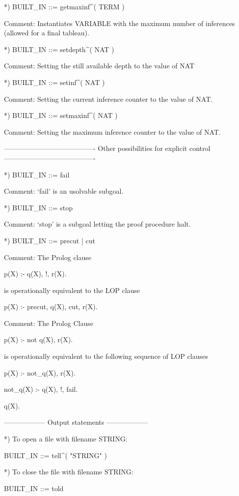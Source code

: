 *) BUILT_IN ::= getmaxinf^( TERM ) 

   Comment: Instantiates VARIABLE with the maximum number 
   	    of inferences (allowed for a final tableau).


*) BUILT_IN ::= setdepth^( NAT )
	
   Comment: Setting the still available depth to the value of NAT

*) BUILT_IN ::= setinf^( NAT )

   Comment: Setting the current inference counter to the value of NAT.

*) BUILT_IN ::= setmaxinf^( NAT )

   Comment: Setting the maximum inference counter to the value of NAT.



----------------------------------------
Other possibilities for explicit control
----------------------------------------


*) BUILT_IN ::= fail

   Comment: `fail' is an usolvable subgoal. 

*) BUILT_IN ::= stop

   Comment: `stop' is a subgoal letting the proof procedure halt.

*) BUILT_IN ::= precut 
            |   cut 

   Comment: The Prolog clause

 	p(X) :- q(X), 
	        !, 
		r(X).

             is operationally equivalent to the LOP clause

 	p(X) :- precut, 
	        q(X), 
		cut, 
		r(X).

   Comment: The Prolog Clause 

 	p(X) :- not q(X), 
		r(X).

 	     is operationally equivalent to the following sequence of
	     LOP clauses

 	p(X) :- not_q(X),
		r(X).

	not_q(X) :- q(X),
		 !,
		 fail.

        q(X).
  

------------------
Output statements
------------------

*) To open a file with filename STRING:

	BUILT_IN ::=  tell^( "STRING" )


*) To close the file with filename STRING:

	BUILT_IN ::= told

